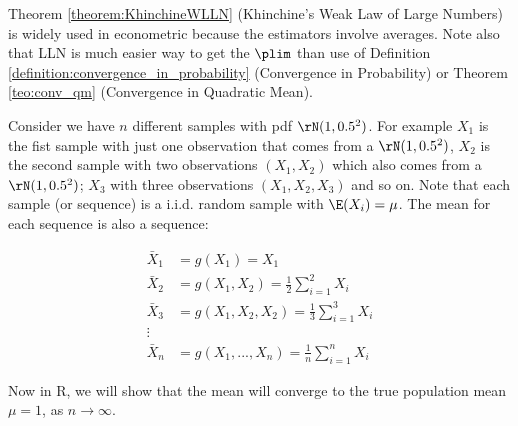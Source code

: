 \begin{remark}
  Theorem \ref{theorem:KhinchineWLLN} (Khinchine's Weak Law of Large Numbers) is widely used in econometric because the estimators involve averages. Note also that LLN is much easier way to get the $\plim$ than use of Definition \ref{definition:convergence_in_probability} (Convergence in Probability) or Theorem \ref{teo:conv_qm} (Convergence in Quadratic Mean).
\end{remark}

\begin{example}
  Consider we have $n$ different samples with pdf $\rN(1, 0.5^2)$. For example $X_1$ is the fist sample with just one observation that comes from a $\rN(1, 0.5^2)$,  $X_2$ is the second sample with two observations $(X_1, X_2)$ which also comes from a $\rN(1, 0.5^2)$; $X_3$ with three observations $(X_1, X_2, X_3)$ and so on. Note that each sample (or sequence) is a i.i.d. random sample with $\E(X_i) = \mu$. The mean for each sequence is also a sequence:
  
\begin{equation*}
  \begin{aligned}
    \bar{X}_1 & = g(X_1) = X_1 \\
    \bar{X}_2 & = g(X_1, X_2) = \frac{1}{2}\sum_{i = 1}^2X_i \\
    \bar{X}_3 & = g(X_1, X_2, X_2) = \frac{1}{3}\sum_{i = 1}^3X_i \\
    \vdots \\
    \bar{X}_n & = g(X_1, ..., X_n) = \frac{1}{n}\sum_{i = 1}^nX_i
  \end{aligned}
\end{equation*}

Now in R, we will show that the mean will converge to the true population mean $\mu = 1$, as $n\to \infty$.

\begin{knitrout}
\color{fgcolor}\begin{kframe}
\begin{alltt}
\hlstd{(}\hlstd{)}  
 \hlkwb{<-}      
 \hlkwb{<-} \hlopt{:}       


\end{alltt}
\end{kframe}
\end{knitrout}
\end{example}
